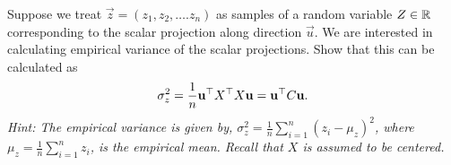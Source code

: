 \begin{enumerate}
\sol{

}

\qitem Suppose we treat $\vec{z} = (z_1, z_2, \hdots. z_n)$ as samples of a random variable $Z \in \mathbb{R}^{}$ corresponding to the scalar projection along direction $\vec{u}$.  We are interested in calculating empirical variance of the scalar projections. Show that this can be calculated as
\begin{equation*}
    \sigma^2_z = \frac{1}{n} \mathbf{u}^{\top} X^{\top} X \mathbf{u} = \mathbf{u}^{\top} C \mathbf{u}.
\end{equation*}
\emph{Hint: The empirical variance is given by, $\sigma^2_z = \frac{1}{n}\sum\limits_{i=1}^n(z_i - \mu_z)^2$, where  $\mu_z = \frac{1}{n}\sum\limits_{i=1}^n z_i$, is the empirical mean. Recall that $X$ is assumed to be centered.}

\sol{
 
}

\end{enumerate}





